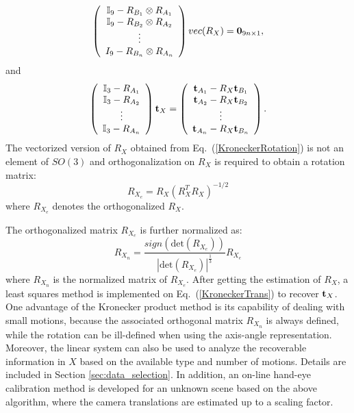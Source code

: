 \documentclass[twocolumn,10pt]{asme2ej}
\newcommand{\ttt}{{\bf t}}
\begin{document}
\begin{equation}
\left(
\begin{array}{c}
\mathbb{I}_{9} - R_{B_{1}} \otimes R_{A_{1}}\\
\mathbb{I}_{9} - R_{B_{2}} \otimes R_{A_{2}}\\
\vdots\\
I_{9} - R_{B_{n}} \otimes R_{A_{n}}
\end{array}
\right) 
vec(R_{X})
 = {\bf{0}}_{9 n \times 1},
\label{KroneckerRotation}
\end{equation}
and
\begin{equation}
\left(
\begin{array}{c}
\mathbb{I}_{3} - R_{A_{1}} \\
\mathbb{I}_{3} - R_{A_{2}} \\
\vdots\\
\mathbb{I}_{3} - R_{A_{n}}
\end{array}
\right) 
{\ttt_{X}}
 = 
\left( 
\begin{array}{c}
{\bf{t}}_{A_{1}} - R_{X}{\bf{t}}_{B_{1}}\\
{\bf{t}}_{A_{2}} - R_{X}{\bf{t}}_{B_{2}}\\
\vdots\\
{\bf{t}}_{A_{n}} - R_{X}{\bf{t}}_{B_{n}}\\
\end{array}
\right).
\label{KroneckerTrans}
\end{equation}
The vectorized version of $R_X$ obtained from Eq.~(\ref{KroneckerRotation}) is not an element of $SO(3)$ and
orthogonalization on $R_{X}$ is required to obtain a rotation matrix:%
\begin{equation}
R_{X_{e}} = R_{X}(R_{X}^{T}R_{X})^{-1/2}
\label{Orthogonolization}
\end{equation}
\cite{horn1986robot}
where $R_{X_{e}}$ denotes the orthogonalized $R_{X}$.

The orthogonalized matrix $R_{X_{e}}$ is further normalized as: %
\begin{equation}
R_{X_{n}} = \dfrac{sign(\textrm{det}(R_{X_{e}}))}{{|\textrm{det}(R_{X_{e}})|}^{\tfrac{1}{3}}}R_{X_{e}}
\label{kron_normal}
\end{equation}
where $R_{X_{n}}$ is the normalized matrix of $R_{X_{e}}$.
After getting the estimation of $R_{X}$, a least squares method is implemented on Eq.~(\ref{KroneckerTrans}) to recover $\ttt_{X}$. One advantage of the Kronecker product method is its capability of dealing with small motions, because the associated orthogonal matrix $R_{X_{n}}$ is always defined, while the rotation can be ill-defined when using the axis-angle representation. Moreover, the linear system can also be used to analyze %
 the  recoverable information in $X$ based on the available type and number of motions. Details are included in Section \ref{sec:data_selection}. In addition, an on-line hand-eye calibration method is developed for an unknown scene based on the above algorithm, where the camera translations are estimated up to a scaling factor. 
\end{document}
